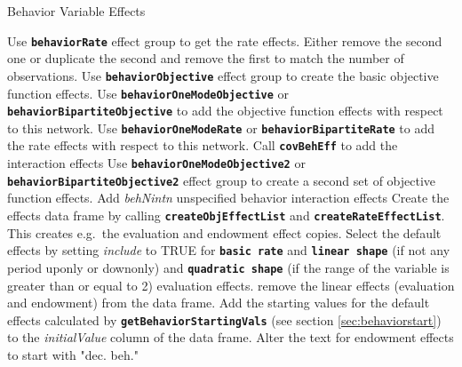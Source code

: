 \documentclass[12pt,a4paper]{article}
\makeatletter
\renewcommand{\=}{\,=\,}
\newcommand{\+}{\,+\,}
\newcommand{\nnm}[1]{\textsf{\textit{#1}}}
\renewcommand{\subsection}{\@startsection{subsection}{2}
                {0pt}{0.7\baselineskip}{0.3\baselineskip}
                {\sffamily} }
\newcommand{\sfn}[1]{\textbf{\texttt{#1}}}
\makeatother
\begin{document}
\subsection{Behavior Variable Effects}
\begin{algorithmic}
\STATE Use \sfn{behaviorRate} effect group to get the rate effects. Either
remove the second one or duplicate the second and remove the first to match the
number of observations.
\STATE Use \sfn{behaviorObjective} effect group to create the basic objective
function effects.
\STATE Use \sfn{behaviorOneModeObjective} or \sfn{behaviorBipartiteObjective} to
add the objective function effects with respect to this network.
\STATE Use \sfn{behaviorOneModeRate} or \sfn{behaviorBipartiteRate} to add
the rate effects with respect to this network.
\ENDFOR
{}
\STATE Call \sfn{covBehEff} to add the interaction effects
\ENDFOR
{}
\STATE Use \sfn{behaviorOneModeObjective2} or \sfn{behaviorBipartiteObjective2}
effect group to create a second set of objective function effects.
\ENDFOR
\STATE Add  \nnm{behNintn} unspecified behavior interaction effects
  \STATE Create the effects data frame by calling \sfn{createObjEffectList} and
  \sfn{createRateEffectList}.  This creates e.g.\ the evaluation and endowment
  effect copies.
  \STATE Select the default effects by setting \nnm{include} to TRUE for
  \sfn{basic rate} and \sfn{linear shape}
  (if not any period uponly or downonly)
  and \sfn{quadratic shape}
  (if the range of the variable is greater than or equal to 2)
  evaluation effects.
  \STATE remove the linear effects (evaluation and endowment)
  from the data frame.
  \ENDIF
  \STATE Add the starting values for the default effects calculated by
  \sfn{getBehaviorStartingVals}  (see section \ref{sec:behaviorstart})
 to the \nnm{initialValue} column of the data
  frame.
\STATE Alter the text for endowment effects to start with "dec. beh."
\end{algorithmic}
\end{document}
